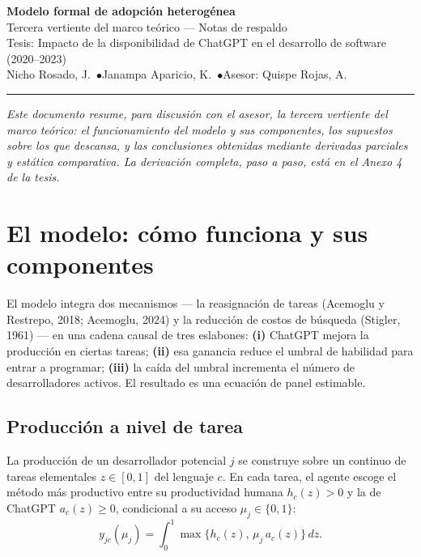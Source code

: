 \documentclass[11pt,a4paper]{article}
\newcommand{\dd}{\,dz}
\begin{document}
\begin{center}
{\LARGE\bfseries\color{pucpblue} Modelo formal de adopción heterogénea}\\[0.3em]
{\large Tercera vertiente del marco teórico --- Notas de respaldo}\\[0.6em]
{\small Tesis: Impacto de la disponibilidad de ChatGPT en el desarrollo de software (2020--2023)}\\
{\small Nicho Rosado, J.\ \quad$\bullet$\quad Janampa Aparicio, K.\ \quad$\bullet$\quad Asesor: Quispe Rojas, A.}
\end{center}

\vspace{0.3em}
\hrule
\vspace{0.6em}

\noindent\textit{\small Este documento resume, para discusión con el asesor, la tercera vertiente del marco teórico: el funcionamiento del modelo y sus componentes, los supuestos sobre los que descansa, y las conclusiones obtenidas mediante derivadas parciales y estática comparativa. La derivación completa, paso a paso, está en el Anexo 4 de la tesis.}

\section{El modelo: cómo funciona y sus componentes}

El modelo integra dos mecanismos --- la reasignación de tareas (Acemoglu y Restrepo, 2018; Acemoglu, 2024) y la reducción de costos de búsqueda (Stigler, 1961) --- en una cadena causal de tres eslabones: \textbf{(i)} ChatGPT mejora la producción en ciertas tareas; \textbf{(ii)} esa ganancia reduce el umbral de habilidad para entrar a programar; \textbf{(iii)} la caída del umbral incrementa el número de desarrolladores activos. El resultado es una ecuación de panel estimable.

\subsection{Producción a nivel de tarea}

La producción de un desarrollador potencial $j$ se construye sobre un continuo de tareas elementales $z\in[0,1]$ del lenguaje $c$. En cada tarea, el agente escoge el método más productivo entre su productividad humana $h_c(z)>0$ y la de ChatGPT $a_c(z)\ge 0$, condicional a su acceso $\mu_j\in\{0,1\}$:
\[
y_{jc}(\mu_j)=\int_0^1 \max\{h_c(z),\,\mu_j\,a_c(z)\}\dd.
\]
\end{document}
